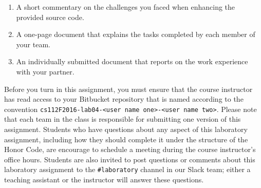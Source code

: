 \begin{enumerate}
  \item A short commentary on the challenges you faced when enhancing the provided source code.

  \item A one-page document that explains the tasks completed by each member of your team.

  \item An individually submitted document that reports on the work experience with your partner.

\end{enumerate}

\vspace*{-.05in}

Before you turn in this assignment, you must ensure that the course instructor has read access to your Bitbucket
repository that is named according to the convention {\tt cs112F2016-lab04-<user name one>-<user name two>}. Please note
that each team in the class is responsible for submitting one version of this assignment. Students who have questions
about any aspect of this laboratory assignment, including how they should complete it under the structure of the Honor
Code, are encourage to schedule a meeting during the course instructor's office hours. Students are also invited to
post questions or comments about this laboratory assignment to the {\tt \#laboratory} channel in our Slack team; either
a teaching assistant or the instructor will answer these questions.


